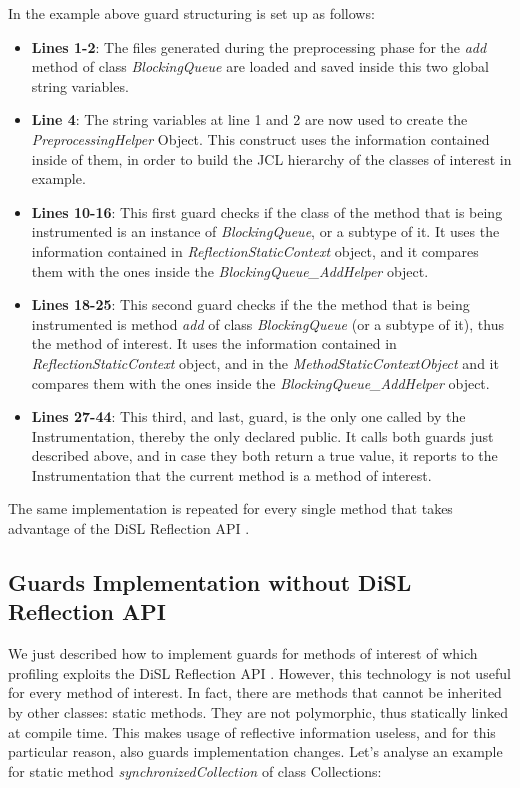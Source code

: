 \documentclass[]{usiinfthesis}
\begin{document}
 In the example above guard structuring is set up as follows:
\begin{itemize}
    \item \textbf{Lines 1-2}: The files generated during the preprocessing phase for the \textit{add} method of class \textit{BlockingQueue} are loaded and saved inside this two global string variables.
    \item \textbf{Line 4}: The string variables at line 1 and 2 are now used to create the \textit{PreprocessingHelper} Object. This construct uses the information contained inside of them, in order to build the JCL hierarchy of the classes of interest in example.
    \item \textbf{Lines 10-16}: This first guard checks if the class of the method that is being instrumented is an instance of \textit{BlockingQueue}, or a subtype of it. It uses the information contained in \textit{ReflectionStaticContext} object, and it compares them with the ones inside the \textit{BlockingQueue\_AddHelper} object.
    \item \textbf{Lines 18-25}: This second guard checks if the the method that is being instrumented is method \textit{add} of class \textit{BlockingQueue} (or a subtype of it), thus the method of interest. It uses the information contained in \textit{ReflectionStaticContext} object, and in the \textit{MethodStaticContextObject} and it compares them with the ones inside the \textit{BlockingQueue\_AddHelper} object.
    \item \textbf{Lines 27-44}: This third, and last, guard, is the only one called by the Instrumentation, thereby the only declared public. It calls both guards just described above, and in case they both return a true value, it reports to the Instrumentation that the current method is a method of interest.
\end{itemize}
The same implementation is repeated for every single method that takes advantage of the DiSL Reflection API \cite{DiSLReflectionAPI}.



\subsection{Guards Implementation without DiSL Reflection API}
We just described how to implement guards for methods of interest of which profiling exploits the DiSL Reflection API \cite{DiSLReflectionAPI}. However, this technology is not useful for every method of interest. In fact, there are methods that cannot be inherited by other classes: static methods. They are not polymorphic, thus statically linked at compile time. This makes usage of reflective information useless, and for this particular reason, also guards implementation changes. Let's analyse an example for static method \textit{synchronizedCollection} of class Collections:
\end{document}
